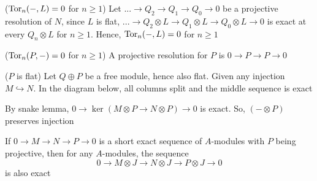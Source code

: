\begin{longproof}
	($\operatorname{Tor}_n(-, L) = 0$ for $n \geq 1$) Let $... \to Q_2 \to Q_1 \to Q_0 \to 0$ be a projective resolution of $N$, since $L$ is flat, $... \to Q_2 \otimes L \to Q_1 \otimes L \to Q_0 \otimes L \to 0$ is exact at every $Q_{n} \otimes L$ for $n \geq 1$. Hence, $\operatorname{Tor}_n(-, L) = 0$ for $n \geq 1$
	
	($\operatorname{Tor}_n(P, -) = 0$ for $n \geq 1$) A projective resolution for $P$ is $0 \to P \to P \to 0$
	
	($P$ is flat) Let $Q \oplus P$ be a free module, hence also flat. Given any injection $M \hookrightarrow N$. In the diagram below, all columns split and the middle sequence is exact
	\begin{center}
	\end{center}
	
	By snake lemma, $0 \to \ker (M \otimes P \to N \otimes P) \to 0$ is exact. So, $(- \otimes P)$ preserves injection
	
	
\end{longproof}

\begin{lemma}
	\label{lemma5}
	If $0 \to M \to N \to P \to 0$ is a short exact sequence of $A$-modules with $P$ being projective, then for any $A$-modules, the sequence 
	$$
		0 \to M \otimes J \to N \otimes J \to P \otimes J \to 0
	$$
	is also exact
\end{lemma}

